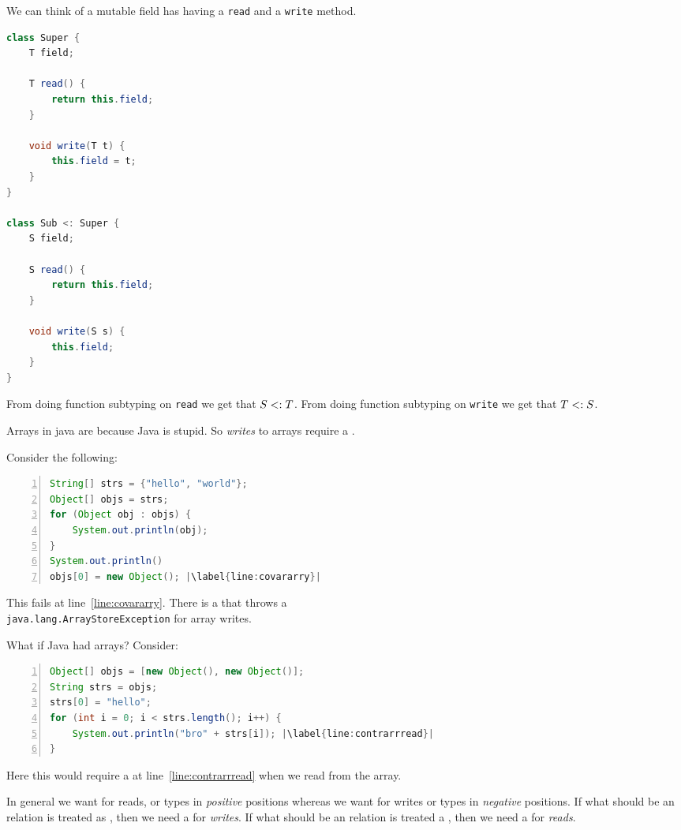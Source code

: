 \documentclass{article}
\begin{document}
\begin{example}
We can think of a mutable field has having a \texttt{read} and a \texttt{write} method.
\begin{lstlisting}[language=Java, escapechar=|]
class Super {
    T field;

    T read() {
        return this.field;
    }

    void write(T t) {
        this.field = t;
    }
}

class Sub <: Super {
    S field;

    S read() {
        return this.field;
    }

    void write(S s) {
        this.field;
    }
}
\end{lstlisting}
From doing function subtyping on \texttt{read} we get that $S <: T$. From doing function subtyping on \texttt{write} we get that $T <: S$.
\end{example}

Arrays in java are \covar{} because Java is stupid. So \textit{writes} to arrays require a \runtimecheck{}.

\begin{example}
Consider the following:
\begin{lstlisting}[language=Java, numbers=left, escapechar=|]
String[] strs = {"hello", "world"};
Object[] objs = strs;
for (Object obj : objs) {
    System.out.println(obj);
}
System.out.println()
objs[0] = new Object(); |\label{line:covararry}|
\end{lstlisting}
This fails at line~\ref{line:covararry}. There is a \runtimecheck{} that throws a \\ \texttt{java.lang.ArrayStoreException} for array writes.
\end{example}

\begin{example}
What if Java had \contra{} arrays? Consider:
\begin{lstlisting}[language=Java, numbers=left, escapechar=|]
Object[] objs = [new Object(), new Object()];
String strs = objs;
strs[0] = "hello";
for (int i = 0; i < strs.length(); i++) {
    System.out.println("bro" + strs[i]); |\label{line:contrarrread}| 
}
\end{lstlisting}
Here this would require a \runtimecheck{} at line~\ref{line:contrarrread} when we read from the array.
\end{example}

In general we want \covar{} for reads, or types in \textit{positive} positions whereas we want \contra{} for writes or types in \textit{negative} positions.
If what should be an \invar{} relation is treated as \covar{}, then we need a \runtimecheck{} for \textit{writes}.
If what should be an \invar{} relation is treated a \contra{}, then we need a \runtimecheck{} for \textit{reads}.
\end{document}
